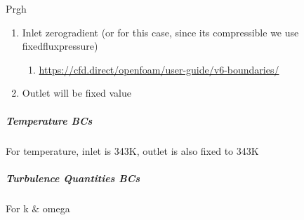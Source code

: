 \documentclass[12pt]{article}
\renewcommand{\_}{\kern-1.5pt\textunderscore\kern-1.5pt}
\begin{document}
P\_rgh\par

\begin{enumerate}
	\item Inlet zerogradient (or for this case, since its compressible we use fixedfluxpressure)\par

\begin{enumerate}
	\item \href{https://cfd.direct/openfoam/user-guide/v6-boundaries/}{https://cfd.direct/openfoam/user-guide/v6-boundaries/}  \par


\end{enumerate}
	\item Outlet will be fixed value\par

\end{enumerate}

\subparagraph{Temperature BCs}


For temperature, inlet is 343K, outlet is also fixed to 343K\par


\subparagraph{Turbulence Quantities BCs}



For k $\&$  omega \par
\end{document}
